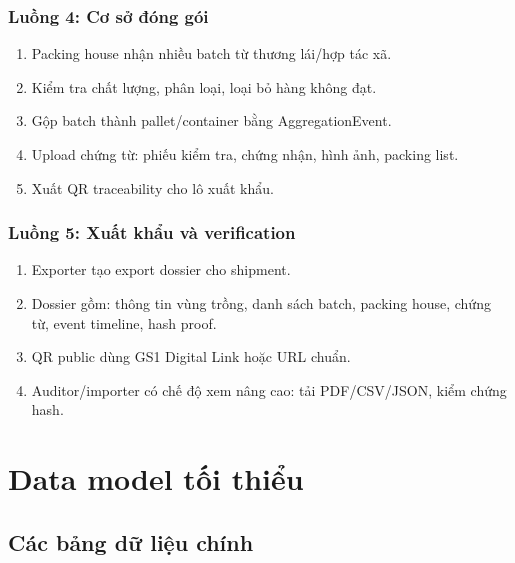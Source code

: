 \documentclass[12pt,a4paper]{article}
\begin{document}
\subsubsection{Luồng 4: Cơ sở đóng gói}

\begin{enumerate}[leftmargin=2em]
    \item Packing house nhận nhiều batch từ thương lái/hợp tác xã.
    \item Kiểm tra chất lượng, phân loại, loại bỏ hàng không đạt.
    \item Gộp batch thành pallet/container bằng AggregationEvent.
    \item Upload chứng từ: phiếu kiểm tra, chứng nhận, hình ảnh, packing list.
    \item Xuất QR traceability cho lô xuất khẩu.
\end{enumerate}

\subsubsection{Luồng 5: Xuất khẩu và verification}

\begin{enumerate}[leftmargin=2em]
    \item Exporter tạo export dossier cho shipment.
    \item Dossier gồm: thông tin vùng trồng, danh sách batch, packing house, chứng từ, event timeline, hash proof.
    \item QR public dùng GS1 Digital Link hoặc URL chuẩn.
    \item Auditor/importer có chế độ xem nâng cao: tải PDF/CSV/JSON, kiểm chứng hash.
\end{enumerate}

\section{Data model tối thiểu}

\subsection{Các bảng dữ liệu chính}
\end{document}
